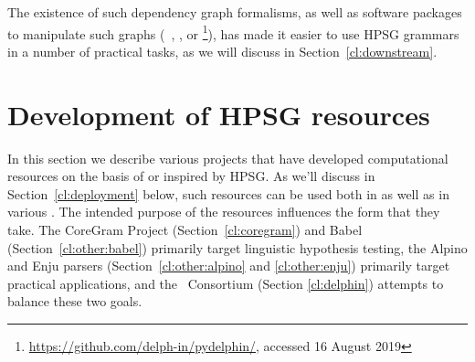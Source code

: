 \documentclass[output=paper,nonflat]{langsci/langscibook}
\begin{document}
The existence of such dependency graph formalisms,
as well as software packages to manipulate such graphs (\eg\ \citealt{copestake2016pydmrs}, \citealt{Her:Kuh:Oep:19}, or \footnote{\url{https://github.com/delph-in/pydelphin/}, accessed 16 August 2019}),
has made it easier to use HPSG grammars in a number of practical tasks,
as we will discuss in Section~\ref{cl:downstream}.









\section{Development of HPSG resources}
\label{cl:resources}

In this section we describe various projects that have developed computational resources on the basis of or inspired by HPSG.
As we'll discuss in Section~\ref{cl:deployment} below,
such resources can be used both in  as well as in various .
The intended purpose of the resources influences the form that they take.
The CoreGram Project (Section~\ref{cl:coregram}) and Babel (Section~\ref{cl:other:babel}) primarily target linguistic hypothesis testing,
the Alpino and Enju parsers (Section~\ref{cl:other:alpino} and \ref{cl:other:enju}) primarily target practical applications,
and the \delphin\ Consortium (Section \ref{cl:delphin}) attempts to balance these two goals.
\end{document}
